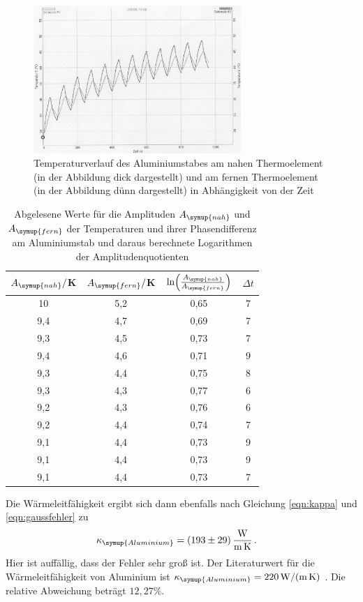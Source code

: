 \begin{figure}
  \centering
  \includegraphics[width=0.7\textwidth]{data/t5undt6_welle.JPEG}
  \caption{Temperaturverlauf des Aluminiumstabes am nahen Thermoelement (in der Abbildung dick dargestellt)
  und am fernen Thermoelement (in der Abbildung dünn dargestellt) in Abhängigkeit von der Zeit}
  \label{fig:aluminium_welle}
\end{figure}

\begin{table}
  \centering
  \caption{Abgelesene Werte für die Amplituden $A_{\symup{nah}}$ und $A_{\symup{fern}}$ der Temperaturen und
  ihrer Phasendifferenz am Aluminiumstab und daraus berechnete Logarithmen der Amplitudenquotienten}
  \label{tab:aluminium_welle}
  \begin{tabular}{c c c c}
    \toprule
     $A_{\symup{nah}}/$K  & $A_{\symup{fern}}/$K & $\ln\Bigl(\frac{A_{\symup{nah}}}{A_{\symup{fern}}}\Bigr)$ & $\Delta t$ \\
    \midrule
    10  	& 5,2  &  0,65 &  7 \\
    9,4	  & 4,7	 &  0,69 &  7 \\
    9,3	  & 4,5	 &  0,73 &  7 \\
    9,4	  & 4,6	 &  0,71 &  9 \\
    9,3	  & 4,4	 &  0,75 &  8 \\
    9,3	  & 4,3	 &  0,77 &  6 \\
    9,2	  & 4,3	 &  0,76 &  6 \\
    9,2	  & 4,4	 &  0,74 &  7 \\
    9,1	  & 4,4	 &  0,73 &  9 \\
    9,1	  & 4,4	 &  0,73 &  9 \\
    9,1	  & 4,4	 &  0,73 &  7 \\
    \bottomrule
  \end{tabular}
\end{table}
Die Wärmeleitfähigkeit ergibt sich dann ebenfalls nach Gleichung \eqref{eqn:kappa}
und \eqref{eqn:gaussfehler} zu
\begin{align}
  \kappa_{\symup{Aluminium}} &= \SI{193(29)}{\watt\per\meter\per\kelvin}\,.\nonumber
\end{align}
Hier ist auffällig, dass der Fehler sehr groß ist.
Der Literaturwert für die Wärmeleitfähigkeit von Aluminium ist
$\kappa_{\symup{Aluminium}} = \SI{220}{\watt\per\meter\per\kelvin}$ \cite{Wärmeleitfähigkeit1}. Die relative
Abweichung beträgt $12,27\%$.


